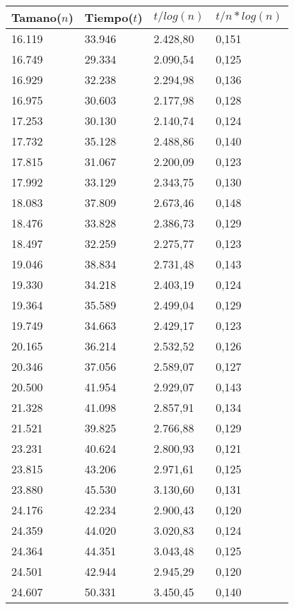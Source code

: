 \begin{table}[H]
\parbox{0.3\textwidth}{
  \begin{tabular}{| l | l | l |l |}
    \hline
    Tamano($n$) & Tiempo($t$) & $t / log(n)$ & $t / n*log(n)$ \\ \hline
16.119	&	33.946	&	2.428,80	&	0,151	\\ \hline
16.749	&	29.334	&	2.090,54	&	0,125	\\ \hline
16.929	&	32.238	&	2.294,98	&	0,136	\\ \hline
16.975	&	30.603	&	2.177,98	&	0,128	\\ \hline
17.253	&	30.130	&	2.140,74	&	0,124	\\ \hline
17.732	&	35.128	&	2.488,86	&	0,140	\\ \hline
17.815	&	31.067	&	2.200,09	&	0,123	\\ \hline
17.992	&	33.129	&	2.343,75	&	0,130	\\ \hline
18.083	&	37.809	&	2.673,46	&	0,148	\\ \hline
18.476	&	33.828	&	2.386,73	&	0,129	\\ \hline
18.497	&	32.259	&	2.275,77	&	0,123	\\ \hline
19.046	&	38.834	&	2.731,48	&	0,143	\\ \hline
19.330	&	34.218	&	2.403,19	&	0,124	\\ \hline
19.364	&	35.589	&	2.499,04	&	0,129	\\ \hline
19.749	&	34.663	&	2.429,17	&	0,123	\\ \hline
20.165	&	36.214	&	2.532,52	&	0,126	\\ \hline
20.346	&	37.056	&	2.589,07	&	0,127	\\ \hline
20.500	&	41.954	&	2.929,07	&	0,143	\\ \hline
21.328	&	41.098	&	2.857,91	&	0,134	\\ \hline
21.521	&	39.825	&	2.766,88	&	0,129	\\ \hline
23.231	&	40.624	&	2.800,93	&	0,121	\\ \hline
23.815	&	43.206	&	2.971,61	&	0,125	\\ \hline
23.880	&	45.530	&	3.130,60	&	0,131	\\ \hline
24.176	&	42.234	&	2.900,43	&	0,120	\\ \hline
24.359	&	44.020	&	3.020,83	&	0,124	\\ \hline
24.364	&	44.351	&	3.043,48	&	0,125	\\ \hline
24.501	&	42.944	&	2.945,29	&	0,120	\\ \hline
24.607	&	50.331	&	3.450,45	&	0,140	\\ \hline

\end{tabular}}
\end{table}
